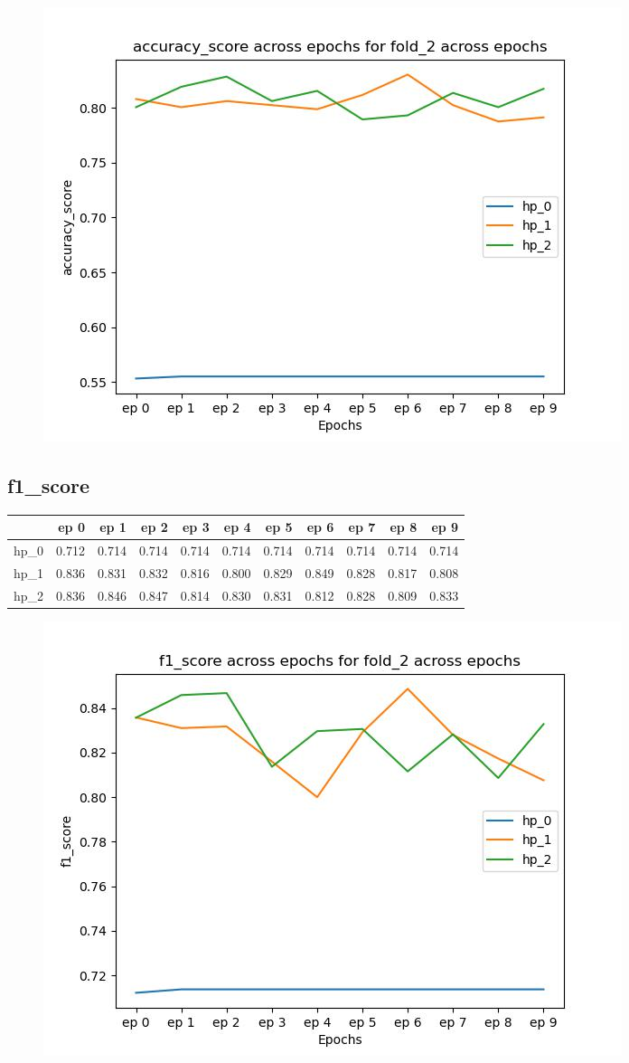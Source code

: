 \documentclass{article}
\begin{document}
\begin{figure}[H]
\includegraphics[scale = 0.75]{fold_2/accuracy_score}
\end{figure}
\subsection{f1\_score}
\begin{tabular}{lrrrrrrrrrr}
\toprule
{} &   ep 0 &   ep 1 &   ep 2 &   ep 3 &   ep 4 &   ep 5 &   ep 6 &   ep 7 &   ep 8 &   ep 9 \\
\midrule
hp\_0 &  0.712 &  0.714 &  0.714 &  0.714 &  0.714 &  0.714 &  0.714 &  0.714 &  0.714 &  0.714 \\
hp\_1 &  0.836 &  0.831 &  0.832 &  0.816 &  0.800 &  0.829 &  0.849 &  0.828 &  0.817 &  0.808 \\
hp\_2 &  0.836 &  0.846 &  0.847 &  0.814 &  0.830 &  0.831 &  0.812 &  0.828 &  0.809 &  0.833 \\
\bottomrule
\end{tabular}

\begin{figure}[H]
\includegraphics[scale = 0.75]{fold_2/f1_score}
\end{figure}
\end{document}
